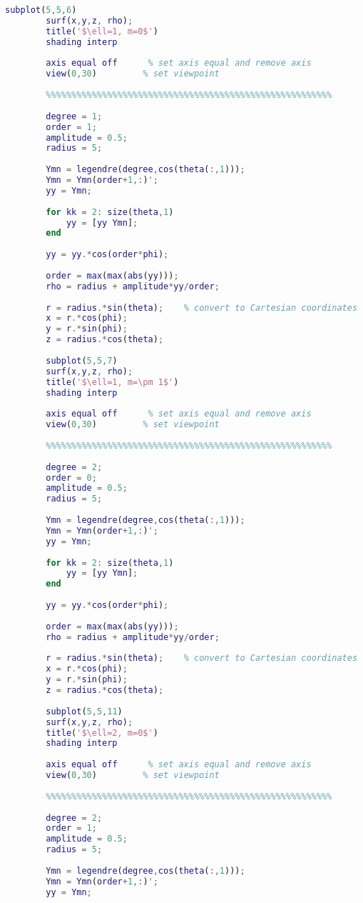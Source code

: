 \begin{lstlisting}[language=MATLAB]
		subplot(5,5,6)
		surf(x,y,z, rho);
		title('$\ell=1, m=0$')
		shading interp
		
		axis equal off      % set axis equal and remove axis
		view(0,30)         % set viewpoint
		
		%%%%%%%%%%%%%%%%%%%%%%%%%%%%%%%%%%%%%%%%%%%%%%%%%%%%%%%%
		
		degree = 1;
		order = 1;
		amplitude = 0.5;
		radius = 5;
		
		Ymn = legendre(degree,cos(theta(:,1)));
		Ymn = Ymn(order+1,:)';
		yy = Ymn;
		
		for kk = 2: size(theta,1)
		    yy = [yy Ymn];
		end
		
		yy = yy.*cos(order*phi);
		
		order = max(max(abs(yy)));
		rho = radius + amplitude*yy/order;
		
		r = radius.*sin(theta);    % convert to Cartesian coordinates
		x = r.*cos(phi);
		y = r.*sin(phi);
		z = radius.*cos(theta);
		
		subplot(5,5,7)
		surf(x,y,z, rho);
		title('$\ell=1, m=\pm 1$')
		shading interp
		
		axis equal off      % set axis equal and remove axis
		view(0,30)         % set viewpoint
		
		%%%%%%%%%%%%%%%%%%%%%%%%%%%%%%%%%%%%%%%%%%%%%%%%%%%%%%%%
		
		degree = 2;
		order = 0;
		amplitude = 0.5;
		radius = 5;
		
		Ymn = legendre(degree,cos(theta(:,1)));
		Ymn = Ymn(order+1,:)';
		yy = Ymn;
		
		for kk = 2: size(theta,1)
		    yy = [yy Ymn];
		end
		
		yy = yy.*cos(order*phi);
		
		order = max(max(abs(yy)));
		rho = radius + amplitude*yy/order;
		
		r = radius.*sin(theta);    % convert to Cartesian coordinates
		x = r.*cos(phi);
		y = r.*sin(phi);
		z = radius.*cos(theta);
		
		subplot(5,5,11)
		surf(x,y,z, rho);
		title('$\ell=2, m=0$')
		shading interp
		
		axis equal off      % set axis equal and remove axis
		view(0,30)         % set viewpoint
		
		%%%%%%%%%%%%%%%%%%%%%%%%%%%%%%%%%%%%%%%%%%%%%%%%%%%%%%%%
		
		degree = 2;
		order = 1;
		amplitude = 0.5;
		radius = 5;
		
		Ymn = legendre(degree,cos(theta(:,1)));
		Ymn = Ymn(order+1,:)';
		yy = Ymn;
		

\end{lstlisting}
